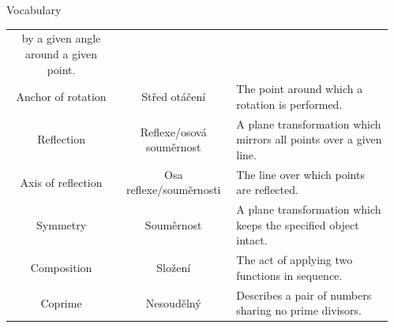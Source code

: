 \documentclass[final]{beamer}
\newlength{\sepwidth}
\newlength{\colwidth}
\newcommand{\separatorcolumn}{\begin{column}{\sepwidth}\end{column}}
\begin{document}
\begin{frame}[t]
\begin{columns}[t]
\begin{column}{\colwidth}
\begin{block}{Vocabulary}
\begin{center}
{\begin{tabular}{c | c | p{}}
     by a given angle around a given point.\\
     Anchor of rotation & Střed otáčení & The point around which a rotation is
     performed.\\
     Reflection & Reflexe/osová souměrnost & A plane transformation which
     mirrors all points over a given line.\\
     Axis of reflection & Osa reflexe/souměrnosti & The line over which points
     are reflected.\\
     Symmetry & Souměrnost & A plane transformation which keeps the specified
     object intact.\\
     Composition & Složení & The act of applying two functions in sequence.\\
     Coprime & Nesoudělný & Describes a pair of numbers sharing no prime
     divisors.
    \end{tabular}
   }
   \end{center}
 \end{block}

\end{column}
\separatorcolumn

\end{columns}
\end{frame}
\end{document}

